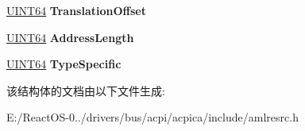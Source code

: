 \begin{DoxyCompactItemize}
\hyperlink{_processor_bind_8h_a57be03562867144161c1bfee95ca8f7c}{U\+I\+N\+T64} {\bfseries Translation\+Offset}
\item 
\mbox{\label{structaml__resource__extended__address64_a2e90f3f0a584bb5c656068e424b05b54}} 
\hyperlink{_processor_bind_8h_a57be03562867144161c1bfee95ca8f7c}{U\+I\+N\+T64} {\bfseries Address\+Length}
\item 
\mbox{\label{structaml__resource__extended__address64_a79cb15fb82d64b6edb2f5ff7c7ee36ed}} 
\hyperlink{_processor_bind_8h_a57be03562867144161c1bfee95ca8f7c}{U\+I\+N\+T64} {\bfseries Type\+Specific}
\end{DoxyCompactItemize}


该结构体的文档由以下文件生成\+:\begin{DoxyCompactItemize}
\item 
E\+:/\+React\+O\+S-\/0../drivers/bus/acpi/acpica/include/amlresrc.\+h\end{DoxyCompactItemize}
